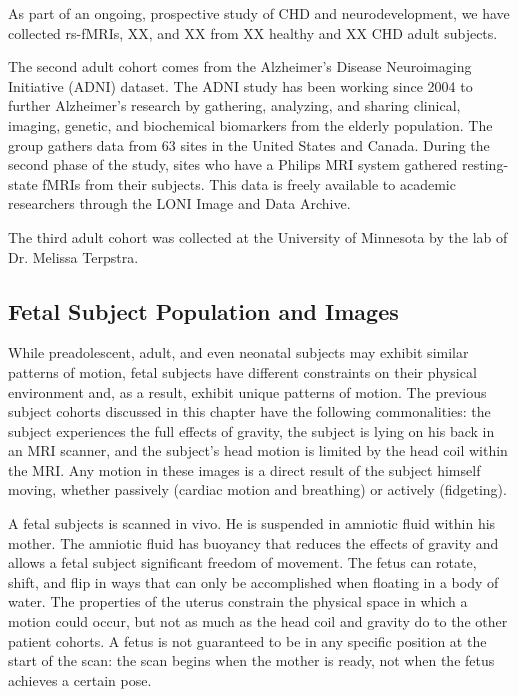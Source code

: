 As part of an ongoing, prospective study of CHD and neurodevelopment, we have collected rs-fMRIs, XX, and XX from XX healthy and XX CHD adult subjects. 

The second adult cohort comes from the Alzheimer's Disease Neuroimaging Initiative (ADNI) dataset. 
The ADNI study has been working since 2004 to further Alzheimer's research by gathering, analyzing, and sharing clinical, imaging, genetic, and biochemical biomarkers from the elderly population. The group gathers data from 63 sites in the United States and Canada. During the second phase of the study, sites who have a Philips MRI system gathered resting-state fMRIs from their subjects. This data is freely available to academic researchers through the LONI Image and Data Archive.

The third adult cohort was collected at the University of Minnesota by the lab of Dr. Melissa Terpstra.

\subsection{Fetal Subject Population and Images}

While preadolescent, adult, and even neonatal subjects may exhibit similar patterns of motion, fetal subjects have different constraints on their physical environment and, as a result, exhibit unique patterns of motion. The previous subject cohorts discussed in this chapter have the following commonalities: the subject experiences the full effects of gravity, the subject is lying on his back in an MRI scanner, and the subject's head motion is limited by the head coil within the MRI. Any motion in these images is a direct result of the subject himself moving, whether passively (cardiac motion and breathing) or actively (fidgeting).

A fetal subjects is scanned in vivo. He is suspended in amniotic fluid within his mother. The amniotic fluid has buoyancy that reduces the effects of gravity and allows a fetal subject significant freedom of movement. The fetus can rotate, shift, and flip in ways that can only be accomplished when floating in a body of water. The properties of the uterus constrain the physical space in which a motion could occur, but not as much as the head coil and gravity do to the other patient cohorts. A fetus is not guaranteed to be in any specific position at the start of the scan: the scan begins when the mother is ready, not when the fetus achieves a certain pose. 

